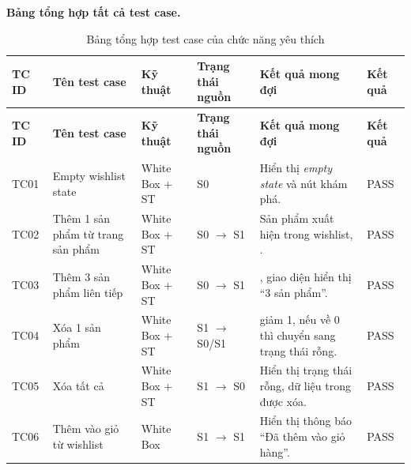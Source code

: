 \textbf{Bảng tổng hợp tất cả test case.}
{\scriptsize
	\renewcommand{\arraystretch}{1.2}
	\setlength{\tabcolsep}{3pt}
	\begin{longtable}{|>{\centering\arraybackslash}p{1.3cm}|>{\raggedright\arraybackslash}p{2.6cm}|>{\raggedright\arraybackslash}p{2.0cm}|>{\raggedright\arraybackslash}p{1.9cm}|>{\raggedright\arraybackslash}p{3.8cm}|>{\centering\arraybackslash}p{1.3cm}|}
		\caption{Bảng tổng hợp test case của chức năng yêu thích}\label{tab:wishlist-summary-testcases}                                                                                                 \\
		\hline
		\textbf{TC ID} & \textbf{Tên test case}            & \textbf{Kỹ thuật}        & \textbf{Trạng thái nguồn} & \textbf{Kết quả mong đợi}                                        & \textbf{Kết quả} \\
		\hline
		\endfirsthead
		\hline
		\textbf{TC ID} & \textbf{Tên test case}            & \textbf{Kỹ thuật}        & \textbf{Trạng thái nguồn} & \textbf{Kết quả mong đợi}                                        & \textbf{Kết quả} \\
		\hline
		\endhead
		TC01           & Empty wishlist state              & White Box + ST           & S0                        & Hiển thị \textit{empty state} và nút khám phá.                   & PASS             \\
		\hline
		TC02           & Thêm 1 sản phẩm từ trang sản phẩm & White Box + ST           & S0 $\rightarrow$ S1       & Sản phẩm xuất hiện trong wishlist, \code{count = 1}.             & PASS             \\
		\hline
		TC03           & Thêm 3 sản phẩm liên tiếp         & White Box + ST           & S0 $\rightarrow$ S1       & \code{count = 3}, giao diện hiển thị ``3 sản phẩm''.             & PASS             \\
		\hline
		TC04           & Xóa 1 sản phẩm                    & White Box + ST           & S1 $\rightarrow$ S0/S1    & \code{count} giảm 1, nếu về 0 thì chuyển sang trạng thái rỗng.   & PASS             \\
		\hline
		TC05           & Xóa tất cả                        & White Box + ST           & S1 $\rightarrow$ S0       & Hiển thị trạng thái rỗng, dữ liệu trong \code{storage} được xóa. & PASS             \\
		\hline
		TC06           & Thêm vào giỏ từ wishlist          & White Box                & S1 $\rightarrow$ S1       & Hiển thị thông báo ``Đã thêm vào giỏ hàng''.                     & PASS             \\

\end{longtable}}
